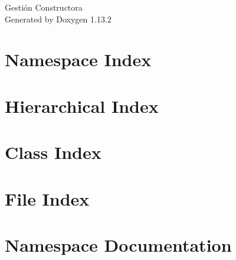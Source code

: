 \documentclass[twoside]{book}
\newcommand{\+}{\discretionary{\mbox{\scriptsize$\hookleftarrow$}}{}{}}
\newcommand{\clearemptydoublepage}{%
    \newpage{\pagestyle{empty}\cleardoublepage}%
  }
\begin{document}
  \raggedbottom
    \hypersetup{pageanchor=false,
                bookmarksnumbered=true,
                pdfencoding=unicode
               }
  \begin{titlepage}
  \vspace*{7cm}
  \begin{center}%
  {\Large Gestión Constructora}\\
  \vspace*{1cm}
  {\large Generated by Doxygen 1.13.2}\\
  \end{center}
  \end{titlepage}
  \clearemptydoublepage
  \tableofcontents
  \clearemptydoublepage
  \hypersetup{pageanchor=true}
\chapter{Namespace Index}

\chapter{Hierarchical Index}

\chapter{Class Index}

\chapter{File Index}

\chapter{Namespace Documentation}












\end{document}
